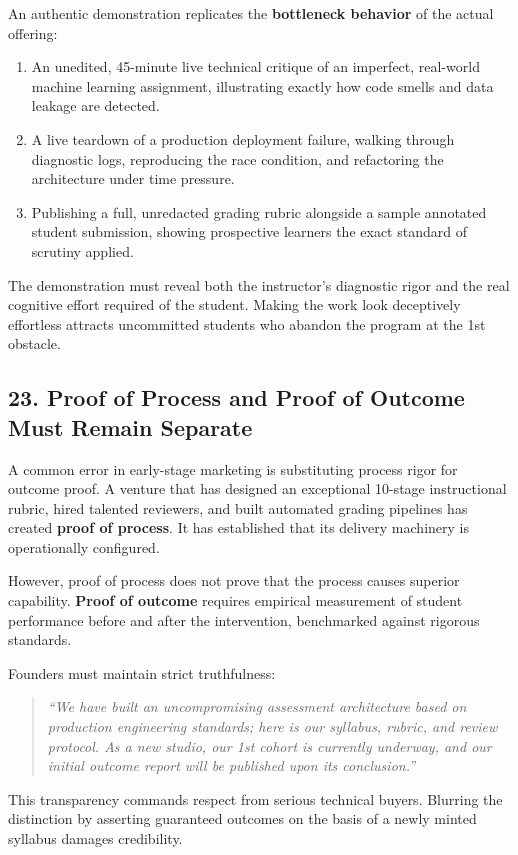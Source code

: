 An authentic demonstration replicates the \textbf{bottleneck behavior} of the actual offering:
\begin{enumerate}
\item An unedited, 45-minute live technical critique of an imperfect, real-world machine learning assignment, illustrating exactly how code smells and data leakage are detected.
\item A live teardown of a production deployment failure, walking through diagnostic logs, reproducing the race condition, and refactoring the architecture under time pressure.
\item Publishing a full, unredacted grading rubric alongside a sample annotated student submission, showing prospective learners the exact standard of scrutiny applied.
\end{enumerate}

The demonstration must reveal both the instructor's diagnostic rigor and the real cognitive effort required of the student. Making the work look deceptively effortless attracts uncommitted students who abandon the program at the 1st obstacle.

\subsection*{23. Proof of Process and Proof of Outcome Must Remain Separate}

A common error in early-stage marketing is substituting process rigor for outcome proof. A venture that has designed an exceptional 10-stage instructional rubric, hired talented reviewers, and built automated grading pipelines has created \textbf{proof of process}. It has established that its delivery machinery is operationally configured.

However, proof of process does not prove that the process causes superior capability. \textbf{Proof of outcome} requires empirical measurement of student performance before and after the intervention, benchmarked against rigorous standards. 

Founders must maintain strict truthfulness:
\begin{quote}
\textit{``We have built an uncompromising assessment architecture based on production engineering standards; here is our syllabus, rubric, and review protocol. As a new studio, our 1st cohort is currently underway, and our initial outcome report will be published upon its conclusion.''}
\end{quote}
This transparency commands respect from serious technical buyers. Blurring the distinction by asserting guaranteed outcomes on the basis of a newly minted syllabus damages credibility.

